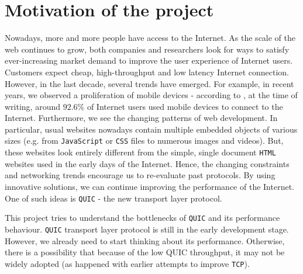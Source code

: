 \documentclass[12pt,a4paper,twoside,openright]{report}
\begin{document}






\section{Motivation of the project}
Nowadays, more and more people have access to the Internet.
As the scale of the web continues to grow, both companies and researchers look for ways to satisfy ever-increasing market demand to improve the user experience of Internet users.
Customers expect cheap, high-throughput and low latency Internet connection.
However, in the last decade, several trends have emerged.
For example, in recent years, we observed a proliferation of mobile devices - according to \cite{bib_number_of_mobile_users}, at the time of writing, around $92.6\%$ of Internet users used mobile devices to connect to the Internet.
Furthermore, we see the changing patterns of web development.
In particular, usual websites nowadays contain multiple embedded objects of various sizes (e.g. from \texttt{JavaScript} or \texttt{CSS} files to numerous images and videos)\cite{bib_Netdev_0x13_QUIC_Tutorial}.
But, these websites look entirely different from the simple, single document \texttt{HTML} websites used in the early days of the Internet.
Hence, the changing constraints and networking trends encourage us to re-evaluate past protocols.
By using innovative solutions, we can continue improving the performance of the Internet. 
One of such ideas is \texttt{QUIC} - the new transport layer protocol.



This project tries to understand the bottlenecks of \texttt{QUIC} and its performance behaviour.
\texttt{QUIC} transport layer protocol is still in the early development stage.
However, we already need to start thinking about its performance.
Otherwise, there is a possibility that because of the low QUIC throughput, it may not be widely adopted (as happened with earlier attempts to improve \texttt{TCP}). 
\end{document}
